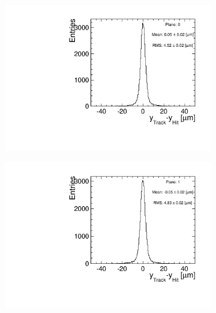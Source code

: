 \begin{figure}[htbp] \centering
  \begin{subfigure}[b]{0.3\textwidth}
    \includegraphics[width=\textwidth]{figures/Telescope/biasedResiduals/BiasedResiduals_run661_PlaneYRMS0.pdf}
    \caption{}
  \end{subfigure}\hfill
  \begin{subfigure}[b]{0.3\textwidth}
    \includegraphics[width=\textwidth]{figures/Telescope/biasedResiduals/BiasedResiduals_run661_PlaneYRMS1.pdf}
    \caption{}
  \end{subfigure}\hfill
  \begin{subfigure}[b]{0.3\textwidth}

\end{subfigure}
\end{figure}
